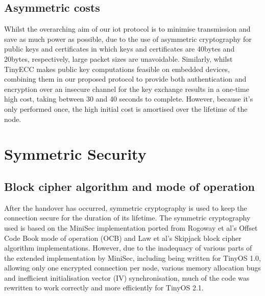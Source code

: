 \documentclass[conference]{./sty/IEEEtran}
\begin{document}
\subsection{Asymmetric costs} %
\label{sub:asymmetric_payload_sizes}
Whilst the overarching aim of our iot protocol is to minimise transmission and save as much power as possible, due to the use of asymmetric cryptography for public keys and certificates in which keys and certificates are 40bytes and 20bytes, respectively, large packet sizes are unavoidable. Similarly, whilst TinyECC makes public key computations feasible on embedded devices, combining them in our proposed protocol to provide both authentication and encryption over an insecure channel for the key exchange results in a one-time high cost, taking between 30 and 40 seconds to complete. However, because it's only performed once, the high initial cost is amortised over the lifetime of the node. 

\section{Symmetric Security} %
\label{sec:symmetric_security}
\subsection{Block cipher algorithm and mode of operation} %
\label{sub:cipher_block_algorithm_and_mode_of_operation}
After the handover has occurred, symmetric cryptography is used to keep the connection secure for the duration of its lifetime. The symmetric cryptography used is based on the MiniSec implementation ported from Rogoway et al's Offset Code Book mode of operation (OCB)\cite{OCB} and Law et al's Skipjack block cipher algorithm\cite{Skipjack} implementations. However, due to the inadequacy of various parts of the extended implementation by MiniSec\cite{MiniSecLink}, including being written for TinyOS 1.0, allowing only one encrypted connection per node, various memory allocation bugs and inefficient initialisation vector (IV) synchronisation, much of the code was rewritten to work correctly and more efficiently for TinyOS 2.1. 
\end{document}
